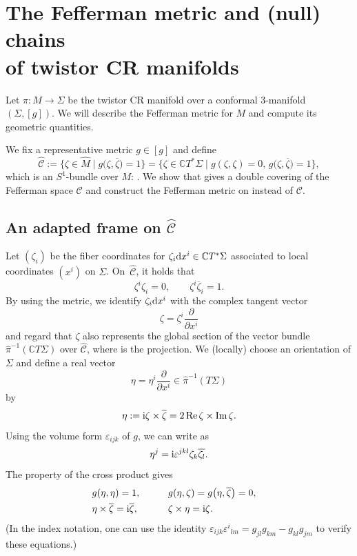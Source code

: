 \documentclass[pdftex]{sigma}
\newcommand\e{\varepsilon}
\newcommand\ol{\overline}
\newcommand{\wh}{\widehat}
\numberwithin{equation}{section}
\begin{document}
\section[The Fefferman metric and (null) chains of twistor CR manifolds]{The Fefferman metric and (null) chains\\ of twistor CR manifolds}\label{Fefferman-twistor-CR}
Let $\pi\colon M\to \Sigma$ be the twistor CR manifold over a conformal $3$-manifold $(\Sigma, [g])$. We will describe the Fefferman metric for $M$ and compute its geometric quantities.

We fix a representative metric $g\in[g]$ and define
\[
\wh{\mathcal{C}}:=\bigl\{\zeta\in \hat M\mid g\bigl(\zeta, \ol\zeta\bigr)=1\bigr\}
=\bigl\{\zeta\in\mathbb{C}T^*\Sigma\mid g(\zeta, \zeta)=0,\, g\bigl(\zeta, \ol\zeta\bigr)=1\bigr\},
\]
which is an $S^1$-bundle over $M$: \smash{$\wh{\mathcal{C}}/\mathrm{U}(1)=M$}.
We show that \smash{$\wh{\mathcal{C}}$} gives a double covering of the Fefferman space $\mathcal{C}$ and construct the Fefferman metric on \smash{$\wh{\mathcal{C}}$} instead of $\mathcal{C}$.



\subsection[An adapted frame on wh{C}]{An adapted frame on $\boldsymbol{\wh{\mathcal{C}}}$}
Let $(\zeta_i)$ be the fiber coordinates for $\zeta_i{\rm d}x^i\in \mathbb{C}T^*\Sigma$ associated to local coordinates $(x^i)$ on $\Sigma$. On~$\wh{\mathcal{C}}$, it holds that
\[
\zeta^i\zeta_i=0, \qquad \zeta^i\ol\zeta_i=1.
\]
By using the metric, we identify $\zeta_i {\rm d}x^i$ with the complex tangent vector
\[
\zeta=\zeta^i\frac{\partial}{\partial x^i}
\]
and regard that $\zeta$ also represents the global section of the vector bundle
$\hat\pi^{-1}(\mathbb{C}T\Sigma)$ over $\wh{\mathcal{C}}$, where \smash{$\hat\pi\colon \wh{\mathcal{C}}\to \Sigma$} is the projection. We (locally) choose an orientation of $\Sigma$ and define a real vector
\[
\eta=\eta^i\frac{\partial}{\partial x^i}\in \hat\pi^{-1}(T\Sigma)
\]
by
\[
\eta:={\rm i}\zeta\times \ol\zeta=2\operatorname{Re}\zeta\times \operatorname{Im}\zeta.
\]
Using the volume form $\e_{ijk}$ of $g$, we can write as
\[
\eta^j={\rm i}\e^{jkl}\zeta_k\ol{\zeta_l}.
\]
The property of the cross product gives
\begin{alignat*}{3}
&g(\eta, \eta)=1, \qquad&& g(\eta, \zeta)=g\bigl(\eta, \ol\zeta\bigr)=0,& \\
&\eta\times\ol\zeta={\rm i}\ol\zeta, \qquad&& \zeta\times\eta={\rm i}\zeta.&
\end{alignat*}
(In the index notation, one can use the identity $\e_{ijk}\e^i{}_{lm}=g_{jl}g_{km}-g_{kl}g_{jm}$ to verify these equations.)
\end{document}

